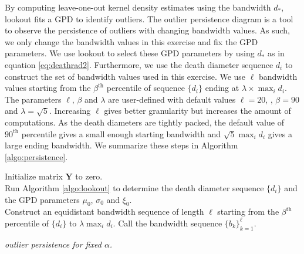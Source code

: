 \documentclass[11pt,a4paper,]{article}
\theoremstyle{definition}
\theoremstyle{definition}
\theoremstyle{definition}
\theoremstyle{remark}
\begin{document}
By computing leave-one-out kernel density estimates using the bandwidth \(d_*\), lookout fits a GPD to identify outliers. The outlier persistence diagram is a tool to observe the persistence of outliers with changing bandwidth values. As such, we only change the bandwidth values in this exercise and fix the GPD parameters. We use lookout to select these GPD parameters by using \(d_*\) as in equation \eqref{eq:deathrad2}. Furthermore, we use the death diameter sequence \(d_i\) to construct the set of bandwidth values used in this exercise. We use \(\ell\) bandwidth values starting from the \(\beta^{\text{th}}\) percentile of sequence \(\{d_i\}\) ending at \(\lambda \times \max_i{d_i}\). The parameters \(\ell, \, \beta\) and \(\lambda\) are user-defined with default values \(\ell = 20\), , \(\beta= 90\) and \(\lambda = \sqrt{5}\). Increasing \(\ell\) gives better granularity but increases the amount of computations. As the death diameters are tightly packed, the default value of \(90^{\text{th}}\) percentile gives a small enough starting bandwidth and \(\sqrt{5} \max_i{d_i}\) gives a large ending bandwidth.
We summarize these steps in Algorithm \ref{algo:persistence}.

\DontPrintSemicolon
\begin{algorithm}\fontsize{11}{12}\selectfont
    Initialize matrix $\bm{Y}$ to zero. \\  
     Run Algorithm \ref{algo:lookout} to determine the death diameter sequence $\{d_i\}$ and the GPD parameters $\mu_0$, $\sigma_0$ and $\xi_0$. \\
     Construct an equidistant bandwidth sequence of length $\ell$ starting from the $\beta^{\text{th}}$ percentile of $\{d_i\}$ to $ \lambda \max_i d_i$. Call the bandwidth sequence $\{b_k\}_{k=1}^{\ell}$. \\
    \caption{\itshape outlier persistence for fixed $\alpha$.}
    \label{algo:persistence}
\end{algorithm}
\end{document}

